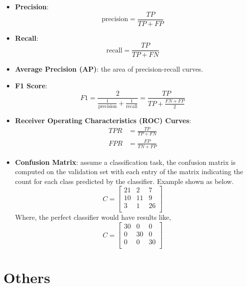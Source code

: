\documentclass[a4paper]{article}
\begin{document}
\begin{itemize}
	\item \textbf{Precision}:
	\begin{equation}
		\text{precision} = \frac{TP}{TP + FP}
	\end{equation}
	\item \textbf{Recall}:
	\begin{equation}
		\text{recall} = \frac{TP}{TP + FN}
	\end{equation}
	\item \textbf{Average Precision (AP)}: the area of precision-recall curves.
	\item \textbf{F1 Score}:
	\begin{equation}
		F1 = \frac{2}{\frac{1}{\text{precision}} + \frac{1}{\text{recall}}} = \frac{TP}{TP + \frac{FN + FP}{2}}
	\end{equation}
	\item \textbf{Receiver Operating Characteristics (ROC) Curves}:
	\begin{align}
		TPR &= \frac{TP}{TP + FN} \\
		FPR &= \frac{FP}{TN + FP}
	\end{align}
	\item \textbf{Confusion Matrix}: assume a classification task, the confusion matrix is computed on the validation set with each entry of the matrix indicating the count for each class predicted by the classifier. Example shown as below.
	\begin{equation}
		C = 
		\begin{bmatrix}
			21 & 2 & 7 \\
			10 & 11 & 9 \\
			3 & 1 & 26 \\
		\end{bmatrix}
	\end{equation}
	Where, the perfect classifier would have results like,
	\begin{equation}
		C = 
		\begin{bmatrix}
			30 & 0 & 0 \\
			0 & 30 & 0 \\
			0 & 0 & 30 \\
		\end{bmatrix}
	\end{equation}
\end{itemize}

\section{Others}
\end{document}
